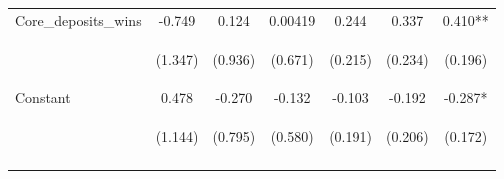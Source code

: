 \documentclass[]{article}
\begin{document}
\begin{center}
\begin{tabular}{lcccccc}
Core\_deposits\_wins & -0.749 & 0.124 & 0.00419 & 0.244 & 0.337 & 0.410** \\
\vspace{4pt} & \begin{footnotesize}(1.347)\end{footnotesize} & \begin{footnotesize}(0.936)\end{footnotesize} & \begin{footnotesize}(0.671)\end{footnotesize} & \begin{footnotesize}(0.215)\end{footnotesize} & \begin{footnotesize}(0.234)\end{footnotesize} & \begin{footnotesize}(0.196)\end{footnotesize} \\
Constant & 0.478 & -0.270 & -0.132 & -0.103 & -0.192 & -0.287* \\
 & \begin{footnotesize}(1.144)\end{footnotesize} & \begin{footnotesize}(0.795)\end{footnotesize} & \begin{footnotesize}(0.580)\end{footnotesize} & \begin{footnotesize}(0.191)\end{footnotesize} & \begin{footnotesize}(0.206)\end{footnotesize} & \begin{footnotesize}(0.172)\end{footnotesize} \\
\vspace{4pt} & \begin{footnotesize}\end{footnotesize} & \begin{footnotesize}\end{footnotesize} & \begin{footnotesize}\end{footnotesize} & \begin{footnotesize}\end{footnotesize} & \begin{footnotesize}\end{footnotesize} & \begin{footnotesize}\end{footnotesize} \\

\end{tabular}
\end{center}
\end{document}
